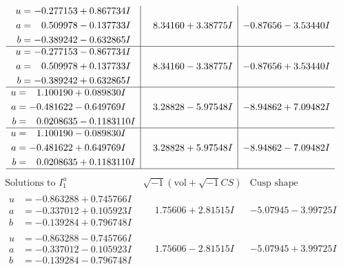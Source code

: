 \documentclass[1p]{elsarticle_modified}
\theoremstyle{definition}
\newcommand{\I}{\sqrt{-1}}
\begin{document}
$$\begin{array}{c|c|c}
\begin{aligned}
u &= -0.277153 + 0.867734 I \\
a &= \phantom{-}0.509978 - 0.137733 I \\
b &= -0.389242 - 0.632865 I\end{aligned}
 & \phantom{-}8.34160 + 3.38775 I & -0.87656 - 3.53440 I \\ \hline\begin{aligned}
u &= -0.277153 - 0.867734 I \\
a &= \phantom{-}0.509978 + 0.137733 I \\
b &= -0.389242 + 0.632865 I\end{aligned}
 & \phantom{-}8.34160 - 3.38775 I & -0.87656 + 3.53440 I \\ \hline\begin{aligned}
u &= \phantom{-}1.100190 + 0.089830 I \\
a &= -0.481622 - 0.649769 I \\
b &= \phantom{-}0.0208635 - 0.1183110 I\end{aligned}
 & \phantom{-}3.28828 - 5.97548 I & -8.94862 + 7.09482 I \\ \hline\begin{aligned}
u &= \phantom{-}1.100190 - 0.089830 I \\
a &= -0.481622 + 0.649769 I \\
b &= \phantom{-}0.0208635 + 0.1183110 I\end{aligned}
 & \phantom{-}3.28828 + 5.97548 I & -8.94862 - 7.09482 I\\
 \hline 
 \end{array}$$\newpage$$\begin{array}{c|c|c}  
\text{Solutions to }I^u_{1}& \I (\text{vol} + \sqrt{-1}CS) & \text{Cusp shape}\\
 \hline 
\begin{aligned}
u &= -0.863288 + 0.745766 I \\
a &= -0.337012 + 0.105923 I \\
b &= -0.139284 + 0.796748 I\end{aligned}
 & \phantom{-}1.75606 + 2.81515 I & -5.07945 - 3.99725 I \\ \hline\begin{aligned}
u &= -0.863288 - 0.745766 I \\
a &= -0.337012 - 0.105923 I \\
b &= -0.139284 - 0.796748 I\end{aligned}
 & \phantom{-}1.75606 - 2.81515 I & -5.07945 + 3.99725 I \\ \hline\begin{aligned}

\end{aligned}
\end{array}$$
\end{document}
